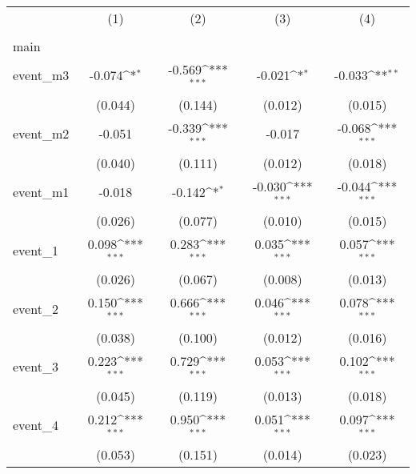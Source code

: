 {
\def\sym#1{\ifmmode^{#1}\else\(^{#1}\)\fi}
\begin{tabular}{l*{4}{c}}
\hline\hline
                    &\multicolumn{1}{c}{(1)}&\multicolumn{1}{c}{(2)}&\multicolumn{1}{c}{(3)}&\multicolumn{1}{c}{(4)}\\
                    &\multicolumn{1}{c}{} &\multicolumn{1}{c}{} &\multicolumn{1}{c}{} &\multicolumn{1}{c}{} \\
\hline
main                &                     &                     &                     &                     \\
event\_m3            &      -0.074\sym{*}  &      -0.569\sym{***}&      -0.021\sym{*}  &      -0.033\sym{**} \\
                    &     (0.044)         &     (0.144)         &     (0.012)         &     (0.015)         \\
[1em]
event\_m2            &      -0.051         &      -0.339\sym{***}&      -0.017         &      -0.068\sym{***}\\
                    &     (0.040)         &     (0.111)         &     (0.012)         &     (0.018)         \\
[1em]
event\_m1            &      -0.018         &      -0.142\sym{*}  &      -0.030\sym{***}&      -0.044\sym{***}\\
                    &     (0.026)         &     (0.077)         &     (0.010)         &     (0.015)         \\
[1em]
event\_1             &       0.098\sym{***}&       0.283\sym{***}&       0.035\sym{***}&       0.057\sym{***}\\
                    &     (0.026)         &     (0.067)         &     (0.008)         &     (0.013)         \\
[1em]
event\_2             &       0.150\sym{***}&       0.666\sym{***}&       0.046\sym{***}&       0.078\sym{***}\\
                    &     (0.038)         &     (0.100)         &     (0.012)         &     (0.016)         \\
[1em]
event\_3             &       0.223\sym{***}&       0.729\sym{***}&       0.053\sym{***}&       0.102\sym{***}\\
                    &     (0.045)         &     (0.119)         &     (0.013)         &     (0.018)         \\
[1em]
event\_4             &       0.212\sym{***}&       0.950\sym{***}&       0.051\sym{***}&       0.097\sym{***}\\
                    &     (0.053)         &     (0.151)         &     (0.014)         &     (0.023)         \\

\end{tabular}}
